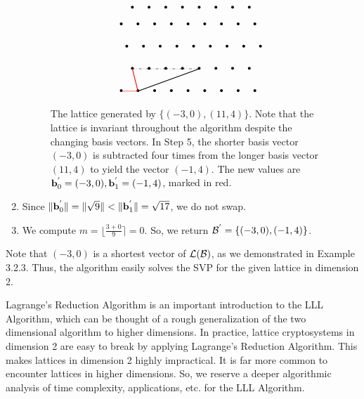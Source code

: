 \documentclass[a4paper,12pt]{article}
\begin{document}
\begin{ex}
\begin{enumerate}
\begin{figure}[H]
$$\begin{tikzpicture}[scale=0.2]
            \foreach \Point in {(-3,0), (0,0), (3,0), (6,0), (9,0), (12,0), (15,0), (18,0), (21,0), (-1,4), (2,4), (5,4), (8,4), (11,4), (14,4), (17,4), (20,4), (-2,8), (1,8), (4,8), (7,8), (10,8), (13,8), (16,8), (19,8), (22,8), (-3,12), (0,12), (3,12), (6,12), (9,12), (12,12), (15,12), (18,12), (21,12), (-1,15), (2,15), (5,15), (8,15), (11,15), (14,15), (17,15), (20,15)}{
                \node at \Point {\textbullet};    
            }
            \draw[red] (0,0)--(-3,0);
            \draw[thick] (0,0)--(11,4);
            \draw[dash dot] (11,4)--(8,4);
            \draw[dash dot] (8,4)--(5,4);
            \draw[dash dot] (5,4)--(2,4);
            \draw[dash dot] (2,4)--(-1,4);
            \draw[thick, color=red] (0,0)--(-1,4);
            \end{tikzpicture}
            $$
            \caption{The lattice generated by $\lbrace(-3,0), (11,4)\rbrace$. Note that the lattice is invariant throughout the algorithm despite the changing basis vectors. In Step 5, the shorter basis vector $(-3,0)$ is subtracted four times from the longer basis vector $(11,4)$ to yield the vector $(-1,4)$. The new values are $\mathbf{b}_0^{'} = (-3,0), \mathbf{b}_1^{'} = (-1,4)$, marked in red.}
        \end{figure}
    \item Since $\|\mathbf{b}_0^{'}\| = \|\sqrt{9}\| < \|\mathbf{b}_1^{'}\| = \sqrt{17}$, we do not swap.
    \item We compute $m = \lfloor\frac{3+0}{9}\rceil = 0$. So, we return $\mathcal{B}^{'} = \lbrace(-3,0),(-1,4)\rbrace$.
\end{enumerate}
Note that $(-3,0)$ is a shortest vector of $\mathcal{L}(\mathcal{B})$, as we demonstrated in Example 3.2.3. Thus, the algorithm easily solves the SVP for the given lattice in dimension 2.
\end{ex}

Lagrange's Reduction Algorithm is an important introduction to the LLL Algorithm, which can be thought of a rough generalization of the two dimensional algorithm to higher dimensions. In practice, lattice cryptosystems in dimension 2 are easy to break by applying Lagrange's Reduction Algorithm. This makes lattices in dimension 2 highly impractical. It is far more common to encounter lattices in higher dimensions. So, we reserve a deeper algorithmic analysis of time complexity, applications, etc. for the LLL Algorithm. 

\newpage

\end{document}
